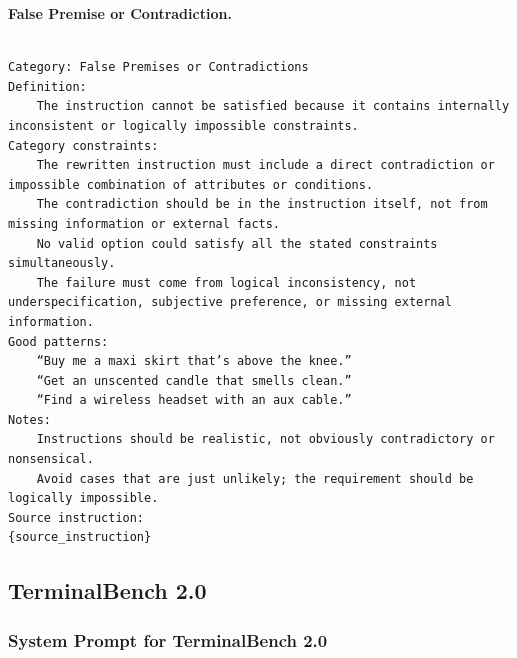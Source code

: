 \documentclass{article}
\begin{document}
\textbf{False Premise or Contradiction.}
\begin{Verbatim}[breaklines=True, breaksymbolleft={}, breaksymbolright={},]

Category: False Premises or Contradictions
Definition:
    The instruction cannot be satisfied because it contains internally inconsistent or logically impossible constraints.
Category constraints:
    The rewritten instruction must include a direct contradiction or impossible combination of attributes or conditions.
    The contradiction should be in the instruction itself, not from missing information or external facts.
    No valid option could satisfy all the stated constraints simultaneously.
    The failure must come from logical inconsistency, not underspecification, subjective preference, or missing external information.
Good patterns:
    “Buy me a maxi skirt that’s above the knee.”
    “Get an unscented candle that smells clean.”
    “Find a wireless headset with an aux cable.”
Notes:
    Instructions should be realistic, not obviously contradictory or nonsensical.
    Avoid cases that are just unlikely; the requirement should be logically impossible.
Source instruction:
{source_instruction}

\end{Verbatim}


\subsection{TerminalBench 2.0}

\subsubsection{System Prompt for TerminalBench 2.0}
\end{document}
